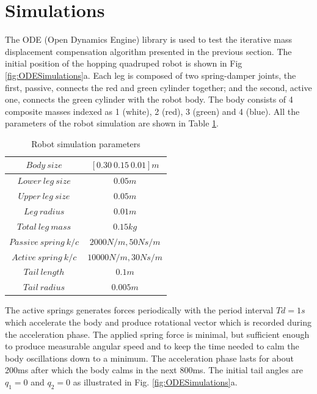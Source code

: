 \section{Simulations}\label{sec:simulation}

The ODE (Open Dynamics Engine) library \cite{ode:2008} is used to test the iterative mass displacement compensation algorithm presented in the previous section. The initial position of the hopping quadruped robot is shown in Fig \ref{fig:ODESimulations}a. Each leg is composed of two spring-damper joints, the first, passive, connects the red and green cylinder together; and the second, active one, connects the green cylinder with the robot body. The body consists of 4 composite masses indexed as 1 (white), 2 (red), 3 (green) and 4 (blue). All the parameters of the  robot simulation are shown in Table \ref{tab:RobotDimensions}.

\begin{table}[!t]
\centering
\begin{tabular}{|c|c|}
	\hline
	$Body\: size$ &  $[0.30\: 0.15\: 0.01]m$ \\
	\hline
	$Lower\:leg\:size$ &  $0.05m$ \\
	\hline
	$Upper\:leg\:size$ &  $0.05m$ \\
	\hline
	$Leg\:radius$ &  $0.01m$ \\
	\hline
	$Total\:leg\:mass$ &  $0.15kg$ \\
	\hline
	$Passive\:spring\:k/c$ &  $2000N/m, 50Ns/m$ \\
	\hline
	$Active\:spring\:k/c$ &  $10000N/m, 30Ns/m$ \\
	\hline
	$Tail\:length$ &  $0.1m$ \\
	\hline
	$Tail\:radius$ &  $0.005m$ \\
	\hline
\end{tabular}
\caption{Robot simulation parameters}\label{tab:RobotDimensions}
\end{table}



The active springs generates forces periodically with the period interval $Td=1s$ which accelerate the body and produce rotational vector which is recorded during the acceleration phase. The applied spring force is minimal, but sufficient enough to produce measurable angular speed and to keep the time needed to calm the body oscillations down to a minimum. The acceleration phase lasts for about 200ms after which the body calms in the next 800ms. The initial tail angles are $q_1=0$ and $q_2=0$ as illustrated in Fig. \ref{fig:ODESimulations}a.

